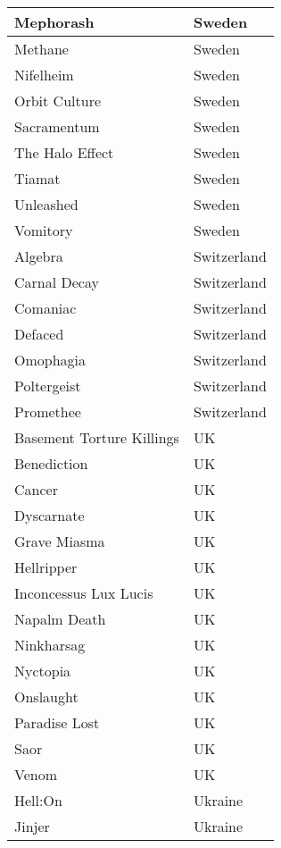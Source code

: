 \documentclass[12pt, a4paper, twoside]{report}
\begin{document}
\begin{center}
\begin{longtable}{|p{5cm}|p{5cm}|}
Mephorash & Sweden \\ \hline
Methane & Sweden \\ \hline
Nifelheim & Sweden \\ \hline
Orbit Culture & Sweden \\ \hline
Sacramentum﻿ & Sweden \\ \hline
The Halo Effect & Sweden \\ \hline
Tiamat & Sweden \\ \hline
Unleashed & Sweden \\ \hline
Vomitory & Sweden \\ \hline
Algebra & Switzerland \\ \hline
Carnal Decay & Switzerland \\ \hline
Comaniac & Switzerland \\ \hline
Defaced & Switzerland \\ \hline
Omophagia & Switzerland \\ \hline
Poltergeist & Switzerland \\ \hline
Promethee & Switzerland \\ \hline
Basement Torture Killings & UK \\ \hline
Benediction & UK \\ \hline
Cancer & UK \\ \hline
Dyscarnate & UK \\ \hline
Grave Miasma & UK \\ \hline
Hellripper & UK \\ \hline
Inconcessus Lux Lucis & UK \\ \hline
Napalm Death & UK \\ \hline
Ninkharsag & UK \\ \hline
Nyctopia & UK \\ \hline
Onslaught & UK \\ \hline
Paradise Lost & UK \\ \hline
Saor & UK \\ \hline
Venom & UK \\ \hline
Hell:On & Ukraine \\ \hline
Jinjer & Ukraine \\ \hline
		\end{longtable}
	\end{center}
\end{document}
